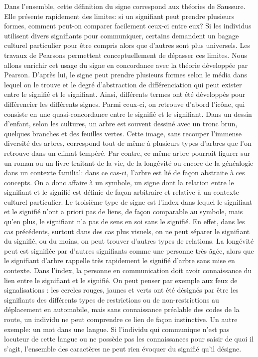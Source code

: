 Dans l'ensemble, cette définition du signe correspond aux théories de Saussure.
Elle présente rapidement des limites: si un signifiant peut prendre plusieurs formes, comment peut-on comparer facilement ceux-ci entre eux? 
Si les individus utilisent divers signifiants pour communiquer, certains demandent un bagage culturel particulier pour être compris alors que d'autres sont plus universels.
Les travaux de Pearsons permettent conceptuellement de dépasser ces limites.
Nous allons enrichir cet usage du signe en concordance avec la théorie développée par Pearson. 
D'après lui, le signe peut prendre plusieurs formes selon le média dans lequel on le trouve et le degré d'abstraction de différenciation qui peut exister entre le signifié et le signifiant. 
Ainsi, différents termes ont été développés pour différencier les différents signes.
Parmi ceux-ci, on retrouve d'abord l'icône, qui consiste en une quasi-concordance entre le signifié et le signifiant. 
Dans un dessin d'enfant, selon les cultures, un arbre est souvent dessiné avec un tronc brun, quelques branches et des feuilles vertes. 
Cette image, sans recouper l'immense diversité des arbres, correspond tout de même à plusieurs types d'arbres que l'on retrouve dans un climat tempéré. 
Par contre, ce même arbre pourrait figurer sur un roman ou un livre traitant de la vie, de la longévité ou encore de la généalogie dans un contexte familial: dans ce cas-ci, l'arbre est lié de façon abstraite à ces concepts. 
On a donc affaire à un symbole, un signe dont la relation entre le signifiant et le signifié est définie de façon arbitraire et relative à un contexte culturel particulier. 
Le troisième type de signe est l'index dans lequel le signifiant et le signifié n'ont a priori pas de liens, de façon comparable au symbole, mais qu'en plus, le signifiant n'a pas de sens en soi sans le signifié. 
En effet, dans les cas précédents, surtout dans des cas plus visuels, on ne peut séparer le signifiant du signifié, ou du moins, on peut trouver d'autres types de relations. 
La longévité peut est signifiée par d'autres signifiants comme une personne très âgée, alors que le signifiant d'arbre rappelle très rapidement le signifié d'arbre sans mise en contexte. 
Dans l'index, la personne en communication doit avoir connaissance du lien entre le signifiant et le signifié. 
On peut penser par exemple aux feux de signalisations : les cercles rouges, jaunes et verts ont été désignés par être les signifiants des différents types de restrictions ou de non-restrictions au déplacement en automobile, mais sans connaissance préalable des codes de la route, un individu ne peut comprendre ce lien de façon instinctive. 
Un autre exemple: un mot dans une langue. 
Si l'individu qui communique n'est pas locuteur de cette langue ou ne possède pas les connaissances pour saisir de quoi il s'agit, l'ensemble des caractères ne peut rien évoquer du signifié qu'il désigne.

